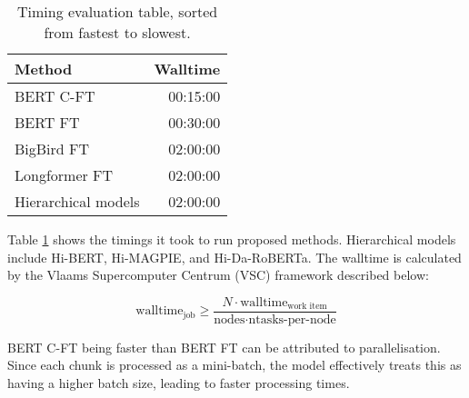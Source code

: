 \begin{table}[htbp]
    \centering
    \begin{tabular}{| l | r |}
        \hline                            \textbf{Method} & \textbf{Walltime} \\
        \hline
        BERT C-FT                                         & 00:15:00          \\
        \hline
        BERT FT                                           & 00:30:00          \\
        \hline
        BigBird FT                                        & 02:00:00          \\
        \hline
        Longformer FT                                     & 02:00:00          \\
        \hline
        Hierarchical models                               & 02:00:00          \\
        \hline
    \end{tabular}
    \caption{Timing evaluation table, sorted from fastest to slowest.}
    \label{table:eval_timings}
\end{table}

Table \ref{table:eval_timings} shows the timings it took to run proposed methods. Hierarchical models include Hi-BERT, Hi-MAGPIE, and Hi-Da-RoBERTa. The walltime is calculated by the Vlaams Supercomputer Centrum (VSC) framework \cite{vscentrum} described below:

\[
    \text{walltime}_{\text{job}} \geq \frac{N \cdot \text{walltime}_{\text{work item}}}{\text{nodes} \cdot \text{ntasks-per-node}}
\]

BERT C-FT being faster than BERT FT can be attributed to parallelisation. Since each chunk is processed as a mini-batch, the model effectively treats this as having a higher batch size, leading to faster processing times.

